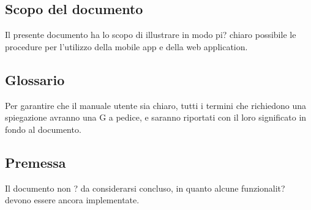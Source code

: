 \documentclass[../manuale-utente.tex]{subfiles}
\begin{document}
\subsection{Scopo del documento}%
\label{sub:scopo_del_documento}
Il presente documento ha lo scopo di illustrare in modo pi? chiaro possibile le procedure per l'utilizzo della mobile app e della web application.

\subsection{Glossario}%
\label{sub:glossario}
Per garantire che il manuale utente sia chiaro, tutti i termini che richiedono una spiegazione avranno una G a pedice, e saranno riportati con il loro significato in fondo al documento.

\subsection{Premessa}%
\label{sub:premessa}
Il documento non ? da considerarsi concluso, in quanto alcune funzionalit? devono essere ancora implementate.
\end{document}

